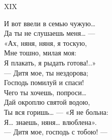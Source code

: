 XIX

И вот ввели в семью чужую…\\
Да ты не слушаешь меня… —\\
«Ах, няня, няня, я тоскую,\\
Мне тошно, милая моя:\\
Я плакать, я рыдать готова!..»\\
— Дитя мое, ты нездорова;\\
Господь помилуй и спаси!\\
Чего ты хочешь, попроси…\\
Дай окроплю святой водою,\\
Ты вся горишь… — «Я не больна:\\
Я… знаешь, няня… влюблена».\\
— Дитя мое, господь с тобою! —\\
